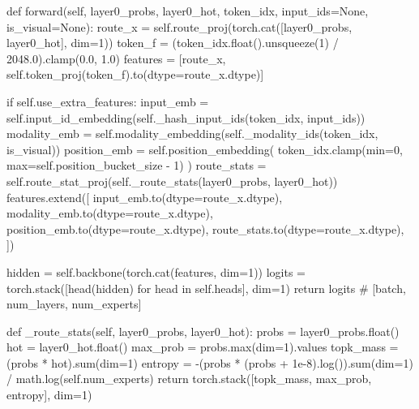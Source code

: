 \begin{CodeBlock}
    def forward(self, layer0_probs, layer0_hot, token_idx, input_ids=None, is_visual=None):
        route_x = self.route_proj(torch.cat([layer0_probs, layer0_hot], dim=1))
        token_f = (token_idx.float().unsqueeze(1) / 2048.0).clamp(0.0, 1.0)
        features = [route_x, self.token_proj(token_f).to(dtype=route_x.dtype)]

        if self.use_extra_features:
            input_emb = self.input_id_embedding(self._hash_input_ids(token_idx, input_ids))
            modality_emb = self.modality_embedding(self._modality_ids(token_idx, is_visual))
            position_emb = self.position_embedding(
                token_idx.clamp(min=0, max=self.position_bucket_size - 1)
            )
            route_stats = self.route_stat_proj(self._route_stats(layer0_probs, layer0_hot))
            features.extend([
                input_emb.to(dtype=route_x.dtype),
                modality_emb.to(dtype=route_x.dtype),
                position_emb.to(dtype=route_x.dtype),
                route_stats.to(dtype=route_x.dtype),
            ])

        hidden = self.backbone(torch.cat(features, dim=1))
        logits = torch.stack([head(hidden) for head in self.heads], dim=1)
        return logits  # [batch, num_layers, num_experts]

    def _route_stats(self, layer0_probs, layer0_hot):
        probs = layer0_probs.float()
        hot = layer0_hot.float()
        max_prob = probs.max(dim=1).values
        topk_mass = (probs * hot).sum(dim=1)
        entropy = -(probs * (probs + 1e-8).log()).sum(dim=1) / math.log(self.num_experts)
        return torch.stack([topk_mass, max_prob, entropy], dim=1)
\end{CodeBlock}

